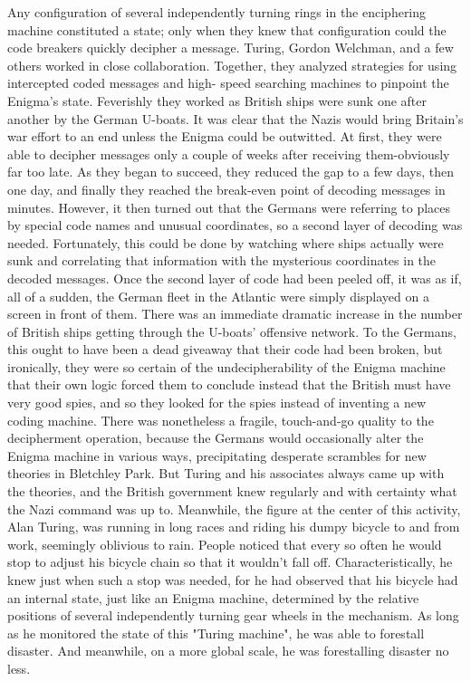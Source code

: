 Any configuration of several independently turning rings in the enciphering machine
constituted a state; only when they knew that configuration could the code breakers
quickly decipher a message.
        Turing, Gordon Welchman, and a few others worked in close collaboration.
Together, they analyzed strategies for using intercepted coded messages and high-
speed searching machines to pinpoint the Enigma's state. Feverishly they worked as
British ships were sunk one after another by the German U-boats. It was clear that the
Nazis would bring Britain's war effort to an end unless the Enigma could be
outwitted.
        At first, they were able to decipher messages only a couple of weeks after
receiving them-obviously far too late. As they began to succeed, they reduced the gap
to a few days, then one day, and finally they reached the break-even point of decoding
messages in minutes. However, it then turned out that the Germans were referring to
places by special code names and unusual coordinates, so a second layer of decoding
was needed. Fortunately, this could be done by watching where ships actually were
sunk and correlating that information with the mysterious coordinates in the decoded
messages. Once the second layer of code had been peeled off, it was as if, all of a
sudden, the German fleet in the Atlantic were simply displayed on a screen in front of
them.
        There was an immediate dramatic increase in the number of British ships
getting through the U-boats' offensive network. To the Germans, this ought to have
been a dead giveaway that their code had been broken, but ironically, they were so
certain of the undecipherability of the Enigma machine that their own logic forced
them to conclude instead that the British must have very good spies, and so they
looked for the spies instead of inventing a new coding machine. There was
nonetheless a fragile, touch-and-go quality to the decipherment operation, because the
Germans would occasionally alter the Enigma machine in various ways, precipitating
desperate scrambles for new theories in Bletchley Park. But Turing and his associates
always came up with the theories, and the British government knew regularly and
with certainty what the Nazi command was up to.
        Meanwhile, the figure at the center of this activity, Alan Turing, was running
in long races and riding his dumpy bicycle to and from work, seemingly oblivious to
rain. People noticed that every so often he would stop to adjust his bicycle chain so
that it wouldn't fall off. Characteristically, he knew just when such a stop was needed,
for he had observed that his bicycle had an internal state, just like an Enigma
machine, determined by the relative positions of several independently turning gear
wheels in the mechanism. As long as he monitored the state of this "Turing machine",
he was able to forestall disaster. And meanwhile, on a more global scale, he was
forestalling disaster no less.

